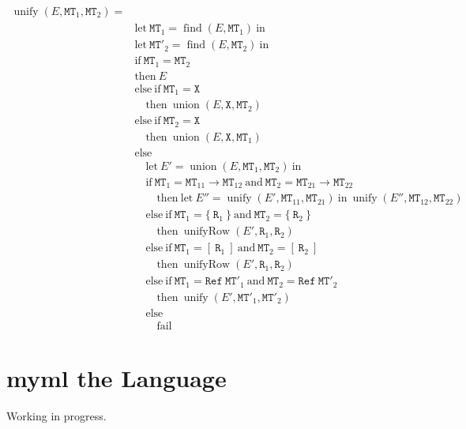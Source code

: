 \documentclass{report}
\newcommand{\theLang}{myml}
\newcommand{\code}{\mathtt}
\DeclareMathOperator{\union}{union}
\DeclareMathOperator{\find}{find}
\DeclareMathOperator{\unify}{unify}
\DeclareMathOperator{\unifyRow}{unifyRow}
\begin{document}
\begin{align*}
\unify(E, \code{MT}_1, \code{MT}_2) = \\
& \text{let}\ \code{MT}_1 = \find(E, \code{MT}_1)\ \text{in} \\
& \text{let}\ \code{MT}'_2 = \find(E, \code{MT}_2)\ \text{in} \\
& \text{if}\ \code{MT}_1 = \code{MT}_2 \\
& \text{then}\ E \\
& \text{else}\ \text{if}\ \code{MT}_1 = \code{X} \\
& \quad \text{then}\ \union(E, \code{X}, \code{MT}_2) \\
& \text{else}\ \text{if}\ \code{MT}_2 = \code{X} \\
& \quad \text{then}\ \union(E, \code{X}, \code{MT}_1) \\
& \text{else} \\
& \quad \text{let}\ E' = \union(E, \code{MT}_1, \code{MT}_2)\ \text{in} \\
& \quad \text{if}\ \code{MT}_1 = \code{MT}_{11}\rightarrow\code{MT}_{12}\ \text{and}\ \code{MT}_2 = \code{MT}_{21}\rightarrow\code{MT}_{22} \\
& \quad \quad \text{then}\ \text{let}\ E'' = \unify(E', \code{MT}_{11}, \code{MT}_{21})\ \text{in}\ \unify(E'', \code{MT}_{12}, \code{MT}_{22}) \\
& \quad \text{else}\ \text{if}\ \code{MT}_1 = \{\ \code{R}_1\ \}\ \text{and}\ \code{MT}_2 = \{\ \code{R}_2\ \} \\
& \quad \quad \text{then}\ \unifyRow(E', \code{R}_1, \code{R}_2) \\
& \quad \text{else}\ \text{if}\ \code{MT}_1 = [\ \code{R}_1\ ]\ \text{and}\ \code{MT}_2 = [\ \code{R}_2\ ] \\
& \quad \quad \text{then}\ \unifyRow(E', \code{R}_1, \code{R}_2) \\
& \quad \text{else}\ \text{if}\ \code{MT}_1 = \code{Ref}\ \code{MT}'_1\ \text{and}\ \code{MT}_2 = \code{Ref}\ \code{MT}'_2 \\
& \quad \quad\text{then}\ \unify(E', \code{MT}'_1, \code{MT}'_2) \\
& \quad \text{else} \\
& \quad \quad \text{fail}
\end{align*}

\chapter{\theLang{} the Language}

Working in progress.
\end{document}
